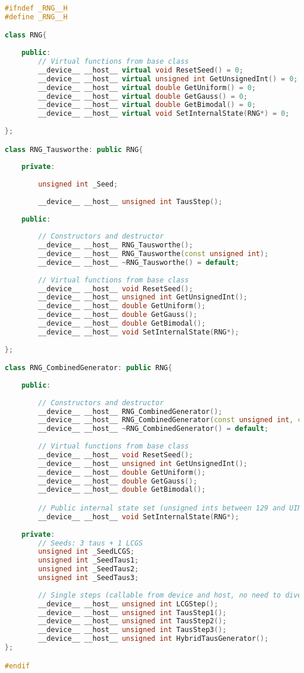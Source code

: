 \begin{lstlisting}[language=C++, caption={\texttt{libraries/CoreLibraries/RandomGenerator/RNG.cuh}}]
#ifndef _RNG__H
#define _RNG__H

class RNG{
	
	public:
		// Virtual functions from base class
		__device__ __host__ virtual void ResetSeed() = 0;
		__device__ __host__ virtual unsigned int GetUnsignedInt() = 0;
		__device__ __host__ virtual double GetUniform() = 0;
		__device__ __host__ virtual double GetGauss() = 0;
		__device__ __host__ virtual double GetBimodal() = 0;
		__device__ __host__ virtual void SetInternalState(RNG*) = 0;
		
};

class RNG_Tausworthe: public RNG{
	
	private:
		
		unsigned int _Seed;
		
		__device__ __host__ unsigned int TausStep();
	
	public:
	
		// Constructors and destructor
		__device__ __host__ RNG_Tausworthe();
		__device__ __host__ RNG_Tausworthe(const unsigned int);
		__device__ __host__ ~RNG_Tausworthe() = default;	
		
		// Virtual functions from base class
		__device__ __host__ void ResetSeed();
		__device__ __host__ unsigned int GetUnsignedInt();
		__device__ __host__ double GetUniform();
		__device__ __host__ double GetGauss();
		__device__ __host__ double GetBimodal();
		__device__ __host__ void SetInternalState(RNG*);
		
};

class RNG_CombinedGenerator: public RNG{
	
	public:
	
		// Constructors and destructor
		__device__ __host__ RNG_CombinedGenerator();
		__device__ __host__ RNG_CombinedGenerator(const unsigned int, const unsigned int, const unsigned int, const unsigned int);
		__device__ __host__ ~RNG_CombinedGenerator() = default;
		
		// Virtual functions from base class
		__device__ __host__ void ResetSeed();
		__device__ __host__ unsigned int GetUnsignedInt();
		__device__ __host__ double GetUniform();
		__device__ __host__ double GetGauss();
		__device__ __host__ double GetBimodal();

		// Public internal state set (unsigned ints between 129 and UINT_MAX)
		__device__ __host__ void SetInternalState(RNG*);
	
	private:
		// Seeds: 3 taus + 1 LCGS
		unsigned int _SeedLCGS;
		unsigned int _SeedTaus1;
		unsigned int _SeedTaus2;
		unsigned int _SeedTaus3;
		
		// Single steps (callable from device and host, no need to diversify)
		__device__ __host__ unsigned int LCGStep();
		__device__ __host__ unsigned int TausStep1();
		__device__ __host__ unsigned int TausStep2();
		__device__ __host__ unsigned int TausStep3();
		__device__ __host__ unsigned int HybridTausGenerator();
};

#endif
\end{lstlisting}

